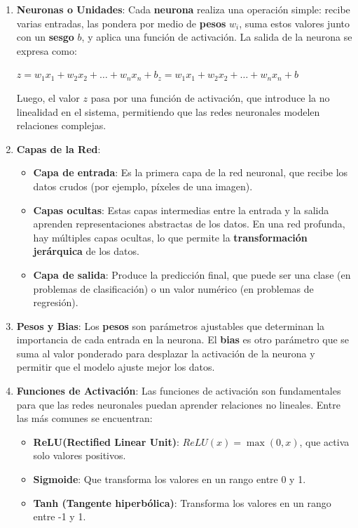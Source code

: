 \begin{enumerate}
    \item \textbf{Neuronas o Unidades}: Cada \textbf{neurona} realiza una operación simple: recibe varias entradas, las
pondera por medio de \textbf{pesos} $w_{i}$, suma estos valores junto con un \textbf{sesgo} $b$, y aplica una función
de activación.
La salida de la neurona se expresa como:

$z =w_{1}x_{1} + w_{2}x_{2} + \dots + w_{n}x_{n} + b_{z} = w_{1}x_{1} + w_{2}x_{2} + \dots + w_{n}x_{n} + b$

Luego, el valor $z$ pasa por una función de activación, que introduce la no linealidad en el sistema, permitiendo que
las redes neuronales modelen relaciones complejas.
    \item \textbf{Capas de la Red}:
\begin{itemize}
    \item \textbf{Capa de entrada}: Es la primera capa de la red neuronal, que recibe los datos crudos (por ejemplo,
píxeles de una imagen).
    \item \textbf{Capas ocultas}: Estas capas intermedias entre la entrada y la salida aprenden representaciones
abstractas de los datos.
En una red profunda, hay múltiples capas ocultas, lo que permite la \textbf{transformación jerárquica} de los datos.
    \item \textbf{Capa de salida}: Produce la predicción final, que puede ser una clase (en problemas de clasificación)
o un valor numérico (en problemas de regresión).
\end{itemize}
    \item \textbf{Pesos y Bias}: Los \textbf{pesos} son parámetros ajustables que determinan la importancia de cada
entrada en la neurona.
El \textbf{bias} es otro parámetro que se suma al valor ponderado para desplazar la activación de la neurona y permitir
que el modelo ajuste mejor los datos.

    \item \textbf{Funciones de Activación}: Las funciones de activación son fundamentales para que las redes neuronales
puedan aprender relaciones no lineales.
Entre las más comunes se encuentran:
\begin{itemize}
    \item \textbf{ReLU(Rectified Linear Unit)}: $ReLU(x)=\max(0,x)$, que activa solo valores positivos.
    \item \textbf{Sigmoide}: Que transforma los valores en un rango entre 0 y 1.
    \item \textbf{Tanh (Tangente hiperbólica)}: Transforma los valores en un rango entre -1 y 1.
\end{itemize}
\end{enumerate}

